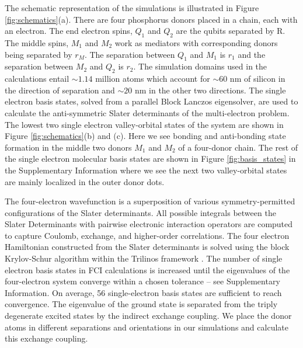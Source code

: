 \documentclass[%
showkeys,
 amsmath,amssymb,
 aps,
prb,
]{revtex4-2}
\begin{document}
 
 The schematic representation of the simulations is illustrated in Figure \ref{fig:schematics}(a). There are four phosphorus donors placed in a chain, each with an electron. The end electron spins, $Q_1$ and $Q_2$ are the qubits separated by R. The middle spins, $M_1$ and $M_2$ work as mediators with corresponding donors being separated by $r_M$. The separation between $Q_1$ and $M_1$ is $r_1$ and the separation between $M_2$ and $Q_2$ is $r_2$. The simulation domains used in the calculations entail $\sim1.14$ million atoms which account for $\sim60$ nm of silicon in the direction of separation and $\sim20$ nm in the other two directions. The single electron basis states, solved from a parallel Block Lanczos eigensolver, are used to calculate the anti-symmetric Slater determinants of the multi-electron problem. The lowest two single electron valley-orbital states of the system are shown in Figure \ref{fig:schematics}(b) and (c). Here we see bonding and anti-bonding state formation in the middle two donors $M_1$ and $M_2$ of a four-donor chain. The rest of the single electron molecular basis states are shown in Figure \ref{fig:basis_states} in the Supplementary Information where we see the next two valley-orbital states are mainly localized in the outer donor dots.  
 
 
 The four-electron wavefunction is a superposition of various symmetry-permitted configurations of the Slater determinants. All possible integrals between the Slater Determinants with pairwise electronic interaction operators are computed to capture Coulomb, exchange, and higher-order correlations. The four electron Hamiltonian constructed from the Slater determinants is solved using the block Krylov-Schur algorithm within the Trilinos framework \cite{bakerAnasaziSoftwareNumerical2009}. The number of single electron basis states in FCI calculations is increased until the eigenvalues of the four-electron system converge within a chosen tolerance -- see Supplementary Information. On average, 56 single-electron basis states are sufficient to reach convergence. The eigenvalue of the ground state is separated from the triply degenerate excited states by the indirect exchange coupling. We place the donor atoms in different separations and orientations in our simulations and calculate this exchange coupling. 
 
\end{document}

